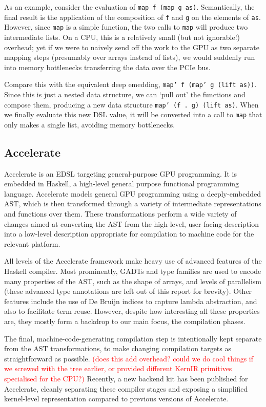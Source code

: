 \documentclass[a4paper,12pt]{article}
\newcommand{\red}[1]{\textcolor{red}{#1}}
\newcommand{\icf}[1]{\mbox{\texttt{#1}}} %
\begin{document}
As an example, consider the evaluation of \icf{map\ f\ (map\ g\ as)}. 
Semantically, the final result is the application of the composition of \icf{f} and \icf{g} on the elements of \icf{as}. 
However, since \icf{map} is a simple function, the two calls to \icf{map} will produce two intermediate lists. 
On a CPU, this is a relatively small (but not ignorable!) overhead; yet if we were to naively send off the work to the GPU as two separate mapping steps (presumably over arrays instead of lists), we would suddenly run into memory bottlenecks transferring the data over the PCIe bus.

Compare this with the equivalent deep emedding, \icf{map'\ f\ (map'\ g\ (lift\ as))}. 
Since this is just a nested data structure, we can `pull out' the functions and compose them, producing a new data structure \icf{map'\ (f\ .\ g)\ (lift\ as)}.
When we finally evaluate this new DSL value, it will be converted into a call to \icf{map} that only makes a single list, avoiding memory bottlenecks.

\subsection{Accelerate}

Accelerate is an EDSL targeting general-purpose GPU programming. 
It is embedded in Haskell, a high-level general purpose functional programming language.
Accelerate models general GPU programming using a deeply-embedded AST, which is then transformed through a variety of intermediate representations and functions over them.
These transformations perform a wide variety of changes aimed at converting the AST from the high-level, user-facing description into a low-level description appropriate for compilation to machine code for the relevant platform.

All levels of the Accelerate framework make heavy use of advanced features of the Haskell compiler.
Most prominently, GADTs and type families are used to encode many properties of the AST, such as the shape of arrays, and levels of parallelism (these advanced type annotations are left out of this report for brevity).
Other features include the use of De Bruijn indices to capture lambda abstraction, and also to facilitate term reuse.
However, despite how interesting all these properties are, they mostly form a backdrop to our main focus, the compilation phases.

The final, machine-code-generating compilation step is intentionally kept separate from the AST transformations, to make changing compilation targets as straightforward as possible.
\red{(does this add overhead? could we do cool things if we screwed with the tree earlier, or provided different KernIR primitives specialised for the CPU?)}
Recently, a new backend kit has been published for Accelerate, cleanly separating these compiler stages and exposing a simplified kernel-level representation compared to previous versions of Accelerate.
\end{document}
